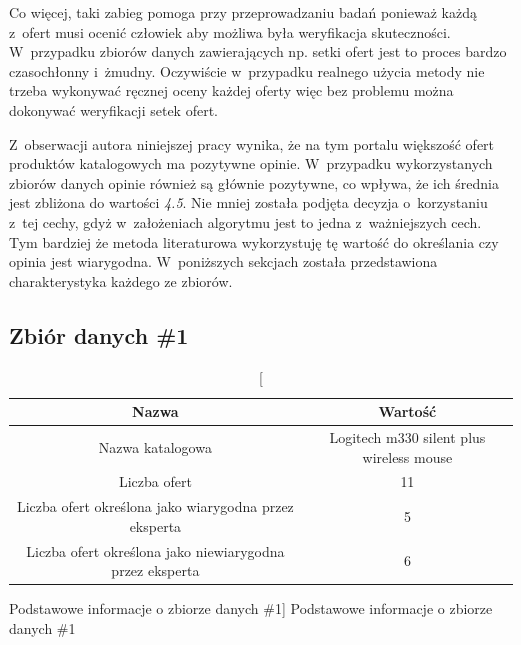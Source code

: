 \documentclass[../Kamil_Kowalewski_Main.tex]{subfiles}
\begin{document}
{{        Co więcej, taki zabieg pomoga przy przeprowadzaniu badań ponieważ każdą z~ofert
        musi ocenić człowiek aby możliwa była weryfikacja skuteczności. W~przypadku
        zbiorów danych zawierających np. setki ofert jest to proces bardzo czasochłonny
        i~żmudny. Oczywiście w~przypadku realnego użycia metody nie trzeba wykonywać
        ręcznej oceny każdej oferty więc bez problemu można dokonywać weryfikacji setek
        ofert.

        Z~obserwacji autora niniejszej pracy wynika, że na tym portalu większość ofert
        produktów katalogowych ma pozytywne opinie. W~przypadku wykorzystanych zbiorów
        danych opinie również są głównie pozytywne, co wpływa, że ich średnia jest
        zbliżona do wartości \textit{4.5}. Nie mniej została podjęta decyzja
        o~korzystaniu z~tej cechy, gdyż w~założeniach algorytmu jest to jedna
        z~ważniejszych cech. Tym bardziej że metoda literaturowa wykorzystuję tę
        wartość do określania czy opinia jest wiarygodna. W~poniższych sekcjach została
        przedstawiona charakterystyka każdego ze zbiorów.

        \subsection{Zbiór danych \#1}
        \label{chapter4:srodowisko_eksperymentalne:zbiory_danych:1} {

            \begin{table}[H]
                \scriptsize
                \centering
                \begin{tabular}{|c|c|}
                    \hline
                    Nazwa & Wartość \\ \hline
                    Nazwa katalogowa & Logitech m330 silent plus wireless mouse \\ \hline
                    Liczba ofert & 11 \\ \hline
                    Liczba ofert określona jako wiarygodna przez eksperta & 5 \\ \hline
                    Liczba ofert określona jako niewiarygodna przez eksperta & 6 \\ \hline
                \end{tabular}
                \caption
                [Podstawowe informacje o zbiorze danych \#1]
                {Podstawowe informacje o zbiorze danych \#1}
                \label{Logitech m330 silent plus wireless mouse}
            \end{table}

}}}
\end{document}
